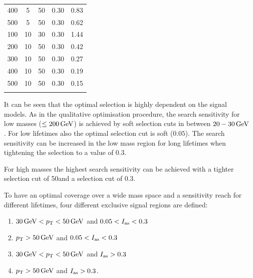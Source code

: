 \begin{table}[!h]
{\begin{tabular}{c |c| c| c| c}
400&                          5&                            50&                           0.30&                         0.83\\
500&                          5&                            50&                           0.30&                         0.62\\
100&                          10&                           30&                           0.30&                         1.44\\
200&                          10&                           50&                           0.30&                         0.42\\
300&                          10&                           50&                           0.30&                         0.27\\
400&                          10&                           50&                           0.30&                         0.19\\
500&                          10&                           50&                           0.30&                         0.15\\
\bottomrule
\multicolumn{5}{c}{} \\
\end{tabular}}
\end{table}

It can be seen that the optimal selection is highly dependent on the signal models.
As in the qualitative optimisation procedure, the search sensitivity for low masses ($\leq 200\,\text{Ge}\kern-0.06667em\text{V}$) is achieved by soft selection cuts in \pt between $20-30\,\text{Ge}\kern-0.06667em\text{V}$.
For low lifetimes also the optimal \ias selection cut is soft ($0.05$).
The search sensitivity can be increased in the low mass region for long lifetimes when tightening the \ias selection to a value of 0.3.

For high masses the highest search sensitivity can be achieved with a tighter \pt selection cut of 50\gev and a \ias selection cut of 0.3.


To have an optimal coverage over a wide mass space and a sensitivity reach for different lifetimes, four different exclusive signal regions are defined:
\begin{enumerate}[1.)]
\item $30\,\text{Ge}\kern-0.06667em\text{V}<p_{\text{T}}<50\,\text{Ge}\kern-0.06667em\text{V}$ and $0.05<I_{\text{as}}<0.3$
\item $p_{\text{T}}>50\,\text{Ge}\kern-0.06667em\text{V}$ and $0.05<I_{\text{as}}<0.3$
\item $30\,\text{Ge}\kern-0.06667em\text{V}<p_{\text{T}}<50\,\text{Ge}\kern-0.06667em\text{V}$ and $I_{\text{as}}>0.3$
\item $p_{\text{T}}>50\,\text{Ge}\kern-0.06667em\text{V}$ and $I_{\text{as}}>0.3$.\\
\end{enumerate}

